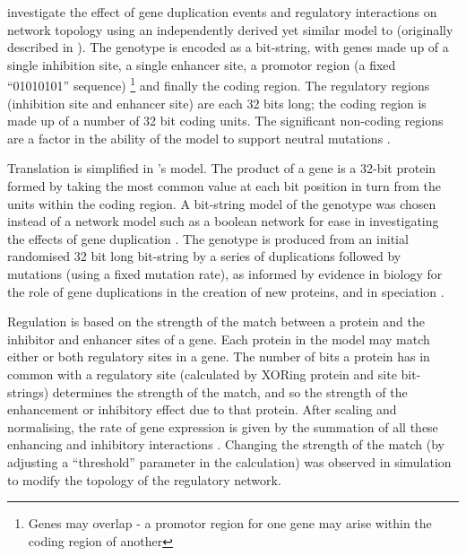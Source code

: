 \cite{Kuo:2006fv} investigate the effect of gene duplication events and regulatory interactions on network topology using an independently derived yet similar model to \cite{Reil:1999rp} (originally described in \cite{Banzhaf:2003kx}). The genotype is encoded as a bit-string, with genes made up of a single inhibition site, a single enhancer site, a promotor region (a fixed ``01010101'' sequence) \footnote{Genes may overlap - a promotor region for one gene may arise within the coding region of another} and finally the coding region. The regulatory regions (inhibition site and enhancer site) are each 32 bits long; the coding region is made up of a number of 32 bit coding units. The significant non-coding regions are a factor in the ability of the model to support neutral mutations \parencite[sec.5]{Banzhaf:2003kx,Kuo:2006fv}.

Translation is simplified in \cite{Kuo:2006fv}'s model. The product of a gene is a 32-bit protein formed by taking the
most common value at each bit position in turn from the units within the coding region. A bit-string model of the genotype
was chosen instead of a network model such as a boolean network for ease in investigating the effects of gene
duplication \parencite[sec. 3 introduction]{Kuo:2006fv}. The  genotype is produced from an initial randomised 32 bit long
bit-string by a series of duplications followed by mutations (using a fixed mutation rate), as informed by evidence in
biology for the role of gene duplications in the creation of new proteins, and in speciation \parencite[sec.
2.3]{Kuo:2006fv}.

Regulation is based on the strength of the match between a protein and the inhibitor and enhancer sites of a gene. Each
protein in the model may match either or both regulatory sites in a gene. The number of bits a protein has in common
with a regulatory site (calculated by XORing protein and site bit-strings) determines the strength of the match, and so
the strength of the enhancement or inhibitory effect due to that protein. After scaling and normalising, the rate of
gene expression is given by the summation of all these enhancing and inhibitory interactions \parencite[sec.
2.2]{Kuo:2006fv}.  Changing the strength of the match (by adjusting a ``threshold'' parameter in the calculation) was
observed in simulation to modify the topology of the regulatory network.

